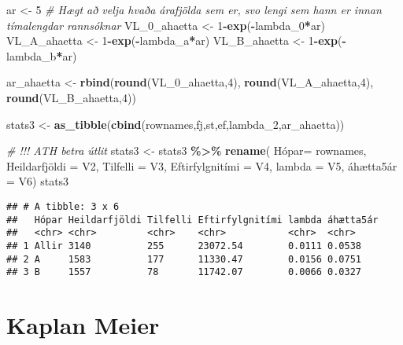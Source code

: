 \documentclass[
]{book}
\newenvironment{Shaded}{\begin{snugshade}}{\end{snugshade}}
\newcommand{\CommentTok}[1]{\textcolor[rgb]{0.56,0.35,0.01}{\textit{#1}}}
\newcommand{\DataTypeTok}[1]{\textcolor[rgb]{0.13,0.29,0.53}{#1}}
\newcommand{\DecValTok}[1]{\textcolor[rgb]{0.00,0.00,0.81}{#1}}
\newcommand{\KeywordTok}[1]{\textcolor[rgb]{0.13,0.29,0.53}{\textbf{#1}}}
\newcommand{\NormalTok}[1]{#1}
\newcommand{\OperatorTok}[1]{\textcolor[rgb]{0.81,0.36,0.00}{\textbf{#1}}}
\newcommand{\StringTok}[1]{\textcolor[rgb]{0.31,0.60,0.02}{#1}}
\begin{document}
\begin{Shaded}
\begin{Highlighting}[]
\NormalTok{ar <{-}}\StringTok{ }\DecValTok{5} \CommentTok{\# Hægt að velja hvaða árafjölda sem er, svo lengi sem hann er innan tímalengdar rannsóknar}
\NormalTok{VL\_}\DecValTok{0}\NormalTok{\_ahaetta <{-}}\StringTok{ }\DecValTok{1}\OperatorTok{{-}}\KeywordTok{exp}\NormalTok{(}\OperatorTok{{-}}\NormalTok{lambda\_}\DecValTok{0}\OperatorTok{*}\NormalTok{ar)}
\NormalTok{VL\_A\_ahaetta <{-}}\StringTok{ }\DecValTok{1}\OperatorTok{{-}}\KeywordTok{exp}\NormalTok{(}\OperatorTok{{-}}\NormalTok{lambda\_a}\OperatorTok{*}\NormalTok{ar)}
\NormalTok{VL\_B\_ahaetta <{-}}\StringTok{ }\DecValTok{1}\OperatorTok{{-}}\KeywordTok{exp}\NormalTok{(}\OperatorTok{{-}}\NormalTok{lambda\_b}\OperatorTok{*}\NormalTok{ar)}

\NormalTok{ar\_ahaetta <{-}}\StringTok{ }\KeywordTok{rbind}\NormalTok{(}\KeywordTok{round}\NormalTok{(VL\_}\DecValTok{0}\NormalTok{\_ahaetta,}\DecValTok{4}\NormalTok{), }\KeywordTok{round}\NormalTok{(VL\_A\_ahaetta,}\DecValTok{4}\NormalTok{), }\KeywordTok{round}\NormalTok{(VL\_B\_ahaetta,}\DecValTok{4}\NormalTok{))}

\NormalTok{stats3 <{-}}\StringTok{ }\KeywordTok{as\_tibble}\NormalTok{(}\KeywordTok{cbind}\NormalTok{(rownames,fj,st,ef,lambda\_}\DecValTok{2}\NormalTok{,ar\_ahaetta))}

\CommentTok{\# !!! ATH betra útlit}
\NormalTok{stats3 <{-}}\StringTok{ }\NormalTok{stats3 }\OperatorTok{\%>\%}\StringTok{ }\KeywordTok{rename}\NormalTok{( Hópar=}\StringTok{ }\NormalTok{rownames, Heildarfjöldi =}\StringTok{ }\NormalTok{V2,  }\DataTypeTok{Tilfelli =}\NormalTok{ V3, Eftirfylgnitími =}\StringTok{ }\NormalTok{V4, }\DataTypeTok{lambda =}\NormalTok{ V5, áhætta5ár =}\StringTok{ }\NormalTok{V6)}
\NormalTok{stats3}
\end{Highlighting}
\end{Shaded}

\begin{verbatim}
## # A tibble: 3 x 6
##   Hópar Heildarfjöldi Tilfelli Eftirfylgnitími lambda áhætta5ár
##   <chr> <chr>         <chr>    <chr>           <chr>  <chr>    
## 1 Allir 3140          255      23072.54        0.0111 0.0538   
## 2 A     1583          177      11330.47        0.0156 0.0751   
## 3 B     1557          78       11742.07        0.0066 0.0327
\end{verbatim}

\hypertarget{KM}{%
\section{Kaplan Meier}\label{KM}}
\end{document}
